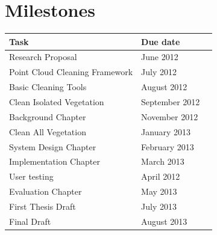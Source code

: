 \documentclass[10pt,twocolumn]{article}
\begin{document}
\section{Milestones}
\begin{table}[h]
\begin{tabular}{llr}
\hline
Task & Due date \\
\hline
Research Proposal & June 2012\\
Point Cloud Cleaning Framework & July 2012\\
Basic Cleaning Tools & August 2012\\
Clean Isolated Vegetation & September 2012\\
Background Chapter & November 2012\\
Clean All Vegetation & January 2013\\
System Design Chapter & February 2013\\
Implementation Chapter & March 2013\\
User testing & April 2012\\
Evaluation Chapter & May 2013\\
First Thesis Draft & July 2013\\
Final Draft & August 2013\\
\hline
\end{tabular}
\end{table}










%
%	
%		
%		
%	


	
\end{document}
